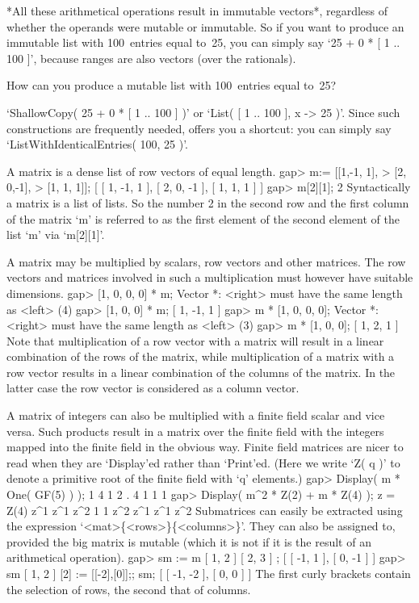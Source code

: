 *All  these arithmetical  operations result in immutable vectors*,
regardless of whether the operands were mutable or immutable.
So if you want to produce an immutable list with 100~entries equal to~25,
you can simply say `25  + 0 * [ 1 .. 100 ]',
because ranges are also vectors (over the rationals).

%
\exercise  How can  you produce  a mutable  list  with 100~entries  equal
to~25?

\answer `ShallowCopy( 25 + 0 * [ 1 .. 100 ] )' or `List(  [ 1 .. 100 ], x
->  25 )'. Since such constructions  are frequently needed, {\GAP} offers
you a shortcut: you can simply say `ListWithIdenticalEntries( 100, 25 )'.

A matrix is a dense list of row vectors of equal length.
\beginexample
    gap> m:= [[1,-1, 1],
    >         [2, 0,-1],
    >         [1, 1, 1]];
    [ [ 1, -1, 1 ], [ 2, 0, -1 ], [ 1, 1, 1 ] ]
    gap> m[2][1];
    2
\endexample
Syntactically a matrix is a list of lists. So the number  2 in the second
row  and the first  column of the matrix `m'  is referred to as the first
element of the second element of the list `m' via `m[2][1]'.

A matrix may be multiplied by scalars, row vectors and other matrices.
The row vectors and matrices involved in such a multiplication must
however have suitable dimensions.
\beginexample
    gap> [1, 0, 0, 0] * m;
    Vector *: <right> must have the same length as <left> (4)
    gap> [1, 0, 0] * m;
    [ 1, -1, 1 ]
    gap> m * [1, 0, 0, 0];
    Vector *: <right> must have the same length as <left> (3)
    gap> m * [1, 0, 0];
    [ 1, 2, 1 ]
\endexample
Note that multiplication  of a row vector with  a matrix will result in a
linear combination of the  rows of the  matrix, while multiplication of a
matrix with a row  vector results in  a linear combination of the columns
of the  matrix. In  the latter case  the  row vector is considered   as a
column vector.

A matrix  of integers can  also be multiplied with  a finite field scalar
and vice  versa. Such products result in  a matrix  over the finite field
with the integers mapped into the finite field in the obvious way. Finite
field matrices  are nicer to read when  they are  `Display'ed rather than
`Print'ed. (Here  we write `Z( q )' to denote a  primitive root of the
finite field with `q' elements.)
\beginexample
    gap> Display( m * One( GF(5) ) );
     1 4 1
     2 . 4
     1 1 1
    gap> Display( m^2 * Z(2) + m * Z(4) );
    z = Z(4)
     z^1 z^1 z^2
       1   1 z^2
     z^1 z^1 z^2
\endexample
Submatrices    can  easily     be    extracted  using    the   expression
`<mat>\{<rows>\}\{<columns>\}'. They   can also be  assigned to, provided
the big matrix  is mutable (which  it is not if it  is  the result of  an
arithmetical operation).
\beginexample
    gap> sm := m{ [ 1, 2 ] }{ [ 2, 3 ] };
    [ [ -1, 1 ], [ 0, -1 ] ]
    gap> sm{ [ 1, 2 ] }{ [2] } := [[-2],[0]];;  sm;
    [ [ -1, -2 ], [ 0, 0 ] ]
\endexample
The first curly brackets contain the selection of rows,
the second that of columns.

